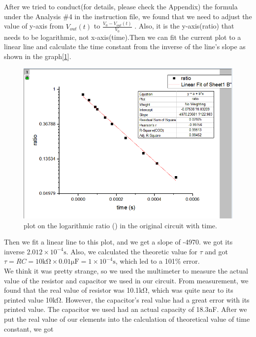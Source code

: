 \phantom{ } After we tried to conduct(for details, please check the Appendix) the formula under the Analysis \#4 in the instruction file, we found that we need to adjust the value of y-axis from $V_{out}(t)$ to $\frac{V_0 - V_{out}(t)}{V_0}$ . Also, it is the y-axis(ratio) that needs to be logarithmic, not x-axis(time).Then we can fit the current plot to a linear line and calculate the time constant from the inverse of the line's slope as shown in the graph[\ref{fig:2.2}].\\
\begin{figure}[!htbp]
	\centering %
	\includegraphics[width=\linewidth]{images/2_2.PNG} %
	\caption{plot on the logarithmic ratio ({\tiny }) in the original circuit with time.} %
	\label{fig:2.2} %
\end{figure}
Then we fit a linear line to this plot, and we get a slope of -4970.
we got its inverse $2.012\times10^{-4}\mathrm{s}$. Also, we calculated the theoretic value for $\tau$ and got 
$\tau = RC = 10\mathrm{k\Omega} \times 0.01\mathrm{\mu F} = 1\times10^{-4}\mathrm{s}$, which led to a 101\% error.\\
\phantom{ } We think it was pretty strange, so we used the multimeter to measure the actual value of the resistor and capacitor we used in our circuit. From measurement, we found that the real value of resistor was 10.1$\mathrm{k\Omega}$, which was quite near to its printed value 10$\mathrm{k\Omega}$. However, the capacitor's real value had a great error with its printed value. The capacitor we used had an actual capacity of 18.3nF. After we put the real value of our elements into the calculation of theoretical value of time constant, we got
